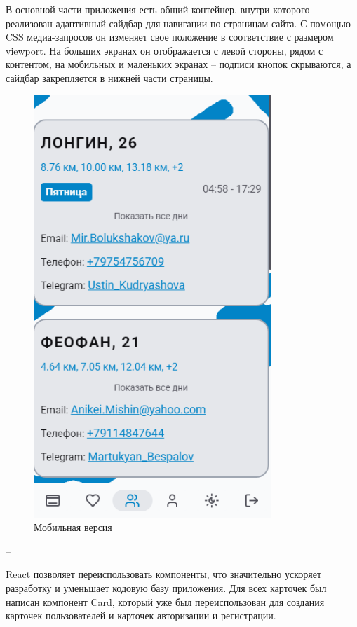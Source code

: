 \documentclass[14pt]{article}
\begin{document}
В основной части приложения есть общий контейнер, внутри которого реализован адаптивный сайдбар для навигации по страницам сайта.
С помощью CSS медиа-запросов он изменяет свое положение в соответствие с размером viewport. На больших экранах он отображается
с левой стороны, рядом с контентом, на мобильных и маленьких экранах – подписи кнопок скрываются, а сайдбар закрепляется в нижней части страницы.
\begin{figure}[H!]
	\centering
	\includegraphics[width=0.8\textwidth]{fig7.png}
	\caption{Мобильная версия}
\end{figure} –

React позволяет переиспользовать компоненты, что значительно ускоряет
разработку и уменьшает кодовую базу приложения. Для всех карточек был написан
компонент Card, который уже был переиспользован для создания карточек
пользователей и карточек авторизации и регистрации.
\end{document}
